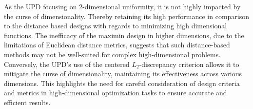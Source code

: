 \documentclass [PhD] {package/uclathes}
\begin{document}
As the UPD focusing on 2-dimensional uniformity, it is not highly impacted by the curse of dimensionality. Thereby retaining its high performance in comparison to the distance based designs with regards to minimizing high dimensional functions.
The inefficacy of the maximin design in higher dimensions, due to the limitations of Euclidean distance metrics, suggests that such distance-based methods may not be well-suited for complex high-dimensional problems. Conversely, the UPD's use of the centered $L_2$-discrepancy criterion allows it to mitigate the curse of dimensionality, maintaining its effectiveness across various dimensions. This highlights the need for careful consideration of design criteria and metrics in high-dimensional optimization tasks to ensure accurate and efficient results.





%
%
%
%
\end{document}
